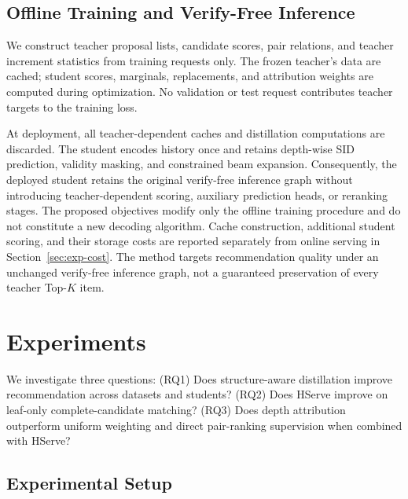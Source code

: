\documentclass[sigconf, anonymous, review]{acmart}
\begin{document}



\subsection{Offline Training and Verify-Free Inference}
\label{sec:method-train-inf}

We construct teacher proposal lists, candidate scores, pair relations,
and teacher increment statistics from training requests only. The frozen teacher's data are cached; student scores, marginals, replacements, and attribution weights are computed during optimization. No validation or test request contributes teacher targets to the training loss.

At deployment, all teacher-dependent caches and distillation
computations are discarded. The student encodes history once and retains
depth-wise SID prediction, validity masking, and constrained
beam expansion. Consequently, the deployed student retains the original verify-free inference graph without introducing teacher-dependent scoring, auxiliary prediction heads, or reranking stages. The proposed objectives modify only the offline training procedure and do not constitute a new decoding algorithm. Cache construction, additional student scoring, and their storage
costs are reported separately from online serving in
Section~\ref{sec:exp-cost}. The method targets recommendation quality under an
unchanged verify-free inference graph, not a guaranteed preservation
of every teacher Top-$K$ item.

\section{Experiments}
\label{sec:exp}

We investigate three questions: (RQ1) Does structure-aware
distillation improve recommendation across datasets and students?
(RQ2) Does HServe improve on leaf-only complete-candidate matching?
(RQ3) Does depth attribution outperform uniform weighting and
direct pair-ranking supervision when combined with HServe?

\subsection{Experimental Setup}
\label{sec:exp-setup}
\end{document}
